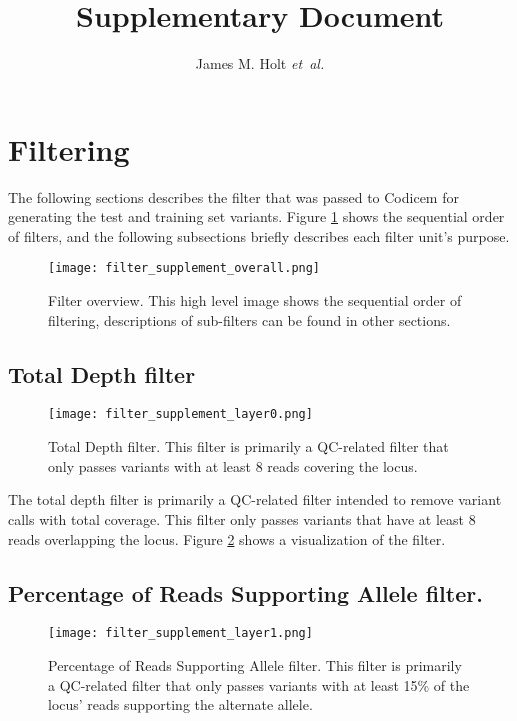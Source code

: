 \documentclass{article}
\begin{document}
\title{Supplementary Document}
\author{James M. Holt {\it et~al.}}

\maketitle

\tableofcontents

\section{Filtering}
The following sections describes the filter that was passed to Codicem for generating the test and training set variants.  Figure \ref{fig:filter_overview} shows the sequential order of filters, and the following subsections briefly describes each filter unit's purpose.

\begin{figure}
\centering
\texttt{[image: filter\_supplement\_overall.png]}
\caption{Filter overview.  This high level image shows the sequential order of filtering, descriptions of sub-filters can be found in other sections.}
\label{fig:filter_overview}
\end{figure}

\subsection{Total Depth filter}

\begin{figure}
\centering
\texttt{[image: filter\_supplement\_layer0.png]}
\caption{Total Depth filter.  This filter is primarily a QC-related filter that only passes variants with at least 8 reads covering the locus.}
\label{fig:filter0}
\end{figure}

The total depth filter is primarily a QC-related filter intended to remove variant calls with total coverage.  This filter only passes variants that have at least 8 reads overlapping the locus.  Figure \ref{fig:filter0} shows a visualization of the filter.

\subsection{Percentage of Reads Supporting Allele filter.}

\begin{figure}
\centering
\texttt{[image: filter\_supplement\_layer1.png]}
\caption{Percentage of Reads Supporting Allele filter.  This filter is primarily a QC-related filter that only passes variants with at least 15\% of the locus' reads supporting the alternate allele.}
\label{fig:filter1}
\end{figure}
\end{document}
